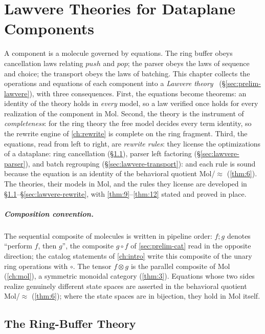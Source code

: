 \chapter{Lawvere Theories for Dataplane Components}\label{ch:lawvere}

A component is a molecule governed by equations.
The ring buffer obeys cancellation laws relating $\mathit{push}$ and
$\mathit{pop}$; the parser obeys the laws of sequence and choice; the
transport obeys the laws of batching. This chapter collects the operations
and equations of each component into a \emph{Lawvere theory}~\cite{lawvere,
arxiv-lawvere} (\S\ref{sec:prelim-lawvere}), with three consequences. First,
the equations become theorems: an identity of the theory holds in
\emph{every} model, so a law verified once holds for every realization of
the component in Mol. Second, the theory is the instrument of
\emph{completeness}: for the ring theory the free model decides every term
identity, so the rewrite engine of \autoref{ch:rewrite} is complete on the
ring fragment. Third, the equations, read from left to right, are
\emph{rewrite rules}: they license the optimizations of a dataplane:
ring cancellation (\S\ref{sec:lawvere-ring}), parser left factoring
(\S\ref{sec:lawvere-parser}), and batch regrouping
(\S\ref{sec:lawvere-transport}): and each rule is sound because the
equation is an identity of the behavioral quotient Mol/$\approx$
(\autoref{thm:6}). The theories, their models in Mol, and the rules they
license are developed in \S\ref{sec:lawvere-ring}--\S\ref{sec:lawvere-rewrite},
with \autoref{thm:9}--\autoref{thm:12} stated and proved in place.

\paragraph{Composition convention.}
The sequential composite of molecules is written in pipeline order: $f;g$
denotes ``perform $f$, then $g$'', the composite $g \circ f$ of
\autoref{sec:prelim-cat} read in the opposite direction; the catalog
statements of \autoref{ch:intro} write this composite of the unary ring
operations with $\circ$. The tensor $f \otimes g$ is the parallel composite
of Mol (\autoref{ch:mol}), a symmetric monoidal category (\autoref{thm:3}).
Equations whose two sides realize genuinely different state spaces are
asserted in the behavioral quotient Mol/$\approx$ (\autoref{thm:6}); where
the state spaces are in bijection, they hold in Mol itself.

\section{The Ring-Buffer Theory}\label{sec:lawvere-ring}

